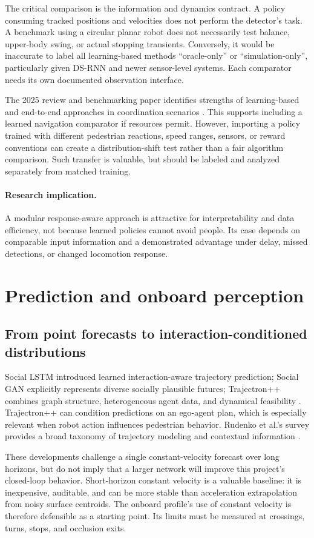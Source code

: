 \documentclass[11pt,a4paper]{article}
\newcommand{\gap}[1]{\paragraph{Research implication.} #1}
\begin{document}
The critical comparison is the information and dynamics contract. A policy
consuming tracked positions and velocities does not perform the detector's
task. A benchmark using a circular planar robot does not necessarily test
balance, upper-body swing, or actual stopping transients. Conversely, it
would be inaccurate to label all learning-based methods ``oracle-only''
or ``simulation-only'', particularly given DS-RNN and newer sensor-level
systems. Each comparator needs its own documented observation interface.

The 2025 review and benchmarking paper identifies strengths of learning-based
and end-to-end approaches in coordination scenarios \citep{survey2023}.
This supports including a learned navigation comparator if resources permit.
However, importing a policy trained with different pedestrian reactions,
speed ranges, sensors, or reward conventions can create a distribution-shift
test rather than a fair algorithm comparison. Such transfer is valuable,
but should be labeled and analyzed separately from matched training.

\gap{A modular response-aware approach is attractive for interpretability
and data efficiency, not because learned policies cannot avoid people.
Its case depends on comparable input information and a demonstrated
advantage under delay, missed detections, or changed locomotion response.}

\section{Prediction and onboard perception}
\label{sec:perception}
\subsection{From point forecasts to interaction-conditioned distributions}
Social LSTM introduced learned interaction-aware trajectory prediction;
Social GAN explicitly represents diverse socially plausible futures;
Trajectron++ combines graph structure, heterogeneous agent data, and
dynamical feasibility \citep{sociallstm,socialgan,trajectron}. Trajectron++
can condition predictions on an ego-agent plan, which is especially relevant
when robot action influences pedestrian behavior. Rudenko et al.'s survey
provides a broad taxonomy of trajectory modeling and contextual information
\citep{prediction}.

These developments challenge a single constant-velocity forecast over long
horizons, but do not imply that a larger network will improve this project's
closed-loop behavior. Short-horizon constant velocity is a valuable baseline:
it is inexpensive, auditable, and can be more stable than acceleration
extrapolation from noisy surface centroids. The onboard profile's use of
constant velocity is therefore defensible as a starting point. Its limits
must be measured at crossings, turns, stops, and occlusion exits.
\end{document}
